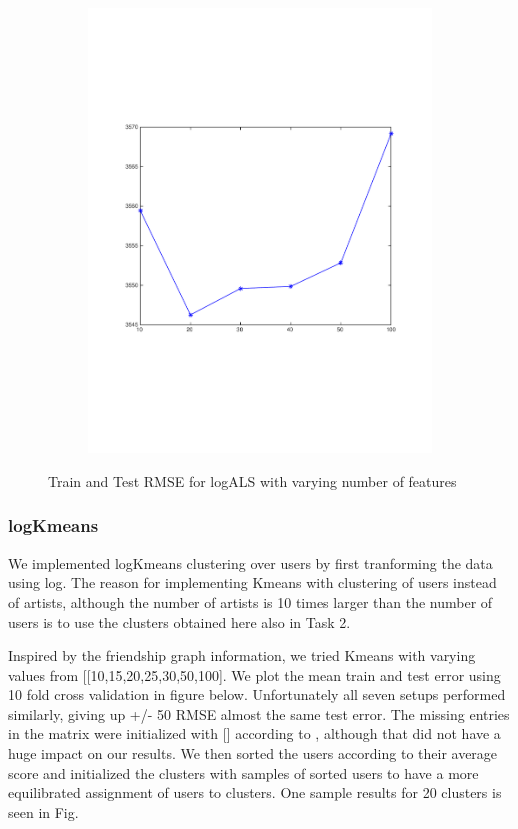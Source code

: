 \begin{figure}[h]
\begin{subfigure}[b]{0.45\textwidth}
    \includegraphics[width=\textwidth]{figures/als_test.pdf}
    \caption{}
  \end{subfigure}
  \caption{Train and Test RMSE for logALS with varying number of features}
  \label{fig:new_plot}
\end{figure}

\subsubsection{logKmeans}
We implemented logKmeans clustering over users by first tranforming the data using log.
The reason for implementing Kmeans with clustering of users 
instead of artists, although the number of artists is 10 times larger than the number of users is to 
use the clusters obtained here also in Task 2.

Inspired by the friendship graph information, we tried Kmeans with
varying values from [[10,15,20,25,30,50,100]. We plot the mean train and test error using 10 fold cross validation in figure below. Unfortunately all seven setups performed similarly,
giving up +/- 50 RMSE almost the same test error.
The missing entries in the matrix were initialized with [] according to , although that did not have a huge impact on our results. We then sorted the users according to their average score and initialized the clusters with samples of sorted users to have a more equilibrated assignment of users to clusters. One sample results for 20 clusters is seen in Fig.

